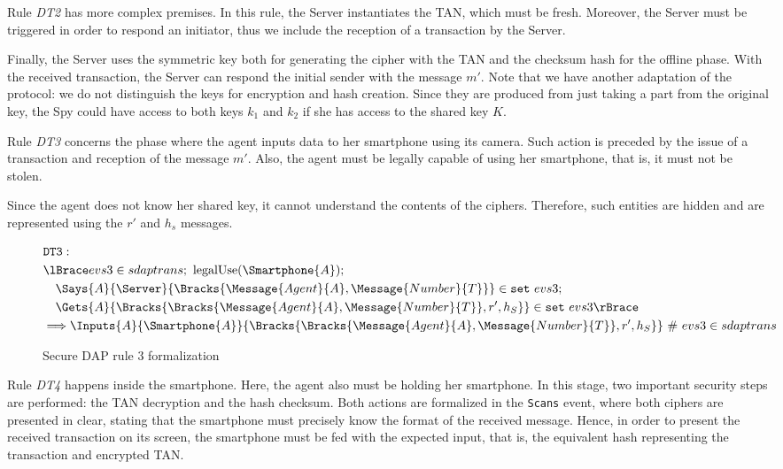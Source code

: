 Rule \textit{DT2} has more complex premises. In this rule, the Server instantiates the TAN, which must be fresh. Moreover, the Server must be triggered in order to respond an initiator, thus we include the reception of a transaction by the Server. 

Finally, the Server uses the symmetric key both for generating the cipher with the TAN and the checksum hash for the offline phase. With the received transaction, the Server can respond the initial sender with the message \(m'\). Note that we have another adaptation of the protocol: we do not distinguish the keys for encryption and hash creation. Since they are produced from just taking a part from the original key, the Spy could have access to both keys \(k_1\) and \(k_2\) if she has access to the shared key \(K\).

Rule \textit{DT3} concerns the phase where the agent inputs data to her smartphone using its camera. Such action is preceded by the issue of a transaction and reception of the message \(m'\). Also, the agent must be legally capable of using her smartphone, that is, it must not be stolen.

Since the agent does not know her shared key, it cannot understand the contents of the ciphers. Therefore, such entities are hidden and are represented using the \(r'\) and \(h_s\) messages.

\begin{figure}[h!]
  \begin{align*}
    & \texttt{DT3}: \newline \\
    & \lBrace evs3 \in sdaptrans;\ \text{legalUse}(\Smartphone{A}); \\
    & \quad \Says{A}{\Server}{\Bracks{\Message{Agent}{A}, \Message{Number}{T}}} \in \texttt{set} \ evs3; \\
    & \quad \Gets{A}{\Bracks{\Bracks{\Message{Agent}{A}, \Message{Number}{T}}, r', h_S}} \in \texttt{set} \ evs3 \rBrace \\
    & \Longrightarrow \Inputs{A}{\Smartphone{A}}{\Bracks{\Bracks{\Message{Agent}{A}, \Message{Number}{T}}, r', h_S}}   \ \# \ evs3 \in sdaptrans
  \end{align*}
  \label{fig:dap-model-3}
  \caption{Secure DAP rule 3 formalization}
\end{figure}

Rule \textit{DT4} happens inside the smartphone. Here, the agent also must be holding her smartphone. In this stage, two important security steps are performed: the TAN decryption and the hash checksum. Both actions are formalized in the \texttt{Scans} event, where both ciphers are presented in clear, stating that the smartphone must precisely know the format of the received message. Hence, in order to present the received transaction on its screen, the smartphone must be fed with the expected input, that is, the equivalent hash representing the transaction and encrypted TAN.

